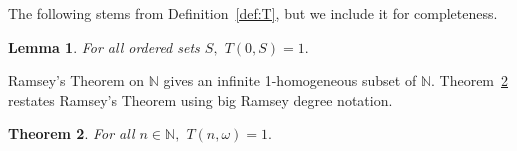 \documentclass[10pt,a4paper]{article}
\newcommand{\oequiv}{\approx}
\newcommand{\COL}{\operatorname{COL}}
\newcommand{\N}{\mathbb{N}}
\newcommand{\numpoints}{n}
\newcommand{\numcolors}{c}
\theoremstyle{plain}
\newtheorem{theorem}{Theorem}[section]
\newtheorem{lemma}[theorem]{Lemma}
\theoremstyle{definition}
\begin{document}
The following stems from Definition~\ref{def:T}, but we include it for completeness.
\begin{lemma}\label{lem:choose0}
    For all ordered sets $S,$ $T(0,S) = 1.$ 
\end{lemma}

Ramsey's Theorem on $\N$ gives an infinite 1-homogeneous subset of $\N$. Theorem~\ref{th:ramsey} restates Ramsey's Theorem using big Ramsey degree notation.

\begin{theorem}\label{th:ramsey}
For all $\numpoints \in \N,$
$T(\numpoints,\omega)=1.$
\end{theorem}





\end{document}

